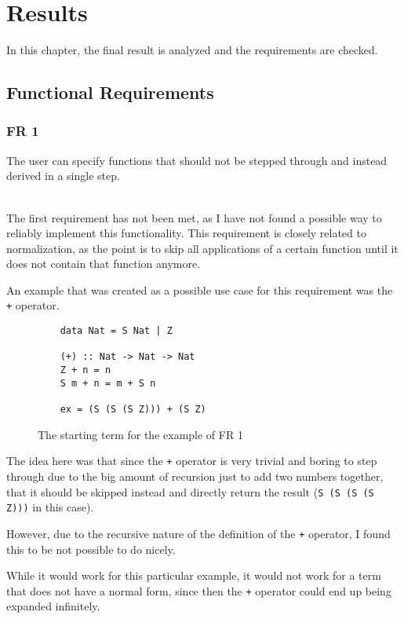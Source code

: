 \chapter{Results}
    \label{chptr:Results}

In this chapter,
the final result is analyzed and the requirements are checked.

\section{Functional Requirements}

\subsection{FR 1}
The user can specify functions that should not be stepped through and instead derived in a single step.

\ \\
The first requirement has not been met,
as I have not found a possible way to reliably implement this functionality.
This requirement is closely related to normalization,
as the point is to skip all applications of a certain function until it does not contain that function anymore.

An example that was created as a possible use case for this requirement was the \texttt{+} operator.

\begin{figure}[!ht]
\begin{verbatim}
    data Nat = S Nat | Z

    (+) :: Nat -> Nat -> Nat
    Z + n = n
    S m + n = m + S n

    ex = (S (S (S Z))) + (S Z)
\end{verbatim}
    \caption{The starting term for the example of FR 1}
    \label{fig:FR1example}
\end{figure}

The idea here was that since the \texttt{+} operator is very trivial and boring to step through due to the big amount of recursion just to add two numbers together,
that it should be skipped instead and directly return the result (\texttt{S (S (S (S Z)))} in this case).

However, due to the recursive nature of the definition of the \texttt{+} operator,
I found this to be not possible to do nicely.

While it would work for this particular example,
it would not work for a term that does not have a normal form,
since then the \texttt{+} operator could end up being expanded infinitely.


